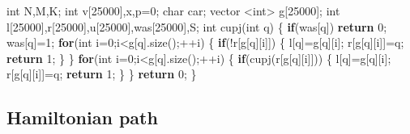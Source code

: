 \documentclass[10pt,]{article}
\newenvironment{Shaded}{}{}
\newcommand{\KeywordTok}[1]{\textcolor[rgb]{0.00,0.44,0.13}{\textbf{{#1}}}}
\newcommand{\DataTypeTok}[1]{\textcolor[rgb]{0.56,0.13,0.00}{{#1}}}
\newcommand{\DecValTok}[1]{\textcolor[rgb]{0.25,0.63,0.44}{{#1}}}
\newcommand{\NormalTok}[1]{{#1}}
\begin{document}
\begin{Shaded}
\begin{Highlighting}[]
\DataTypeTok{int} \NormalTok{N,M,K;}
\DataTypeTok{int} \NormalTok{v[}\DecValTok{25000}\NormalTok{],x,p=}\DecValTok{0}\NormalTok{;}
\DataTypeTok{char} \NormalTok{car;}
\NormalTok{vector <}\DataTypeTok{int}\NormalTok{> g[}\DecValTok{25000}\NormalTok{];}
\DataTypeTok{int} \NormalTok{l[}\DecValTok{25000}\NormalTok{],r[}\DecValTok{25000}\NormalTok{],u[}\DecValTok{25000}\NormalTok{],was[}\DecValTok{25000}\NormalTok{],S;}
\DataTypeTok{int} \NormalTok{cupj(}\DataTypeTok{int} \NormalTok{q) \{}
  \KeywordTok{if}\NormalTok{(was[q])}
    \KeywordTok{return} \DecValTok{0}\NormalTok{;}
  \NormalTok{was[q]=}\DecValTok{1}\NormalTok{;}
  \KeywordTok{for}\NormalTok{(}\DataTypeTok{int} \NormalTok{i=}\DecValTok{0}\NormalTok{;i<g[q].size();++i) \{}
    \KeywordTok{if}\NormalTok{(!r[g[q][i]]) \{}
      \NormalTok{l[q]=g[q][i];}
      \NormalTok{r[g[q][i]]=q;}
      \KeywordTok{return} \DecValTok{1}\NormalTok{;}
    \NormalTok{\}}
  \NormalTok{\}}
  \KeywordTok{for}\NormalTok{(}\DataTypeTok{int} \NormalTok{i=}\DecValTok{0}\NormalTok{;i<g[q].size();++i) \{}
    \KeywordTok{if}\NormalTok{(cupj(r[g[q][i]])) \{}
      \NormalTok{l[q]=g[q][i];}
      \NormalTok{r[g[q][i]]=q;}
      \KeywordTok{return} \DecValTok{1}\NormalTok{;}
    \NormalTok{\}}
  \NormalTok{\}}
  \KeywordTok{return} \DecValTok{0}\NormalTok{;}
\NormalTok{\}}
\end{Highlighting}
\end{Shaded}

\subsection{Hamiltonian path}
\end{document}
